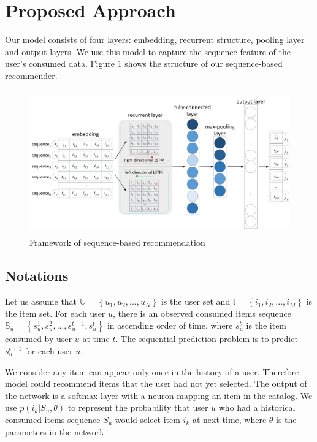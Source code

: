 \documentclass[runningheads]{llncs}
\begin{document}
\section{Proposed Approach}

Our model consists of four layers: embedding, recurrent structure, pooling layer and output layers. We use this model to capture the sequence feature of the user's consumed data. Figure 1 shows the structure of our sequence-based recommender.
\begin{figure}[htbp]
\centerline
{\includegraphics[height=6.2cm,width=\linewidth]{image/structer.png}}
\caption{Framework of sequence-based recommendation }
\end{figure}
\subsection{Notations }\label{AA}
Let us assume that $\mathbb{U}= \left \{ u_{1},u_{2},...,u_{N} \right \}\label{eq}$ is the user set and $\mathbb{I}= \left \{ i_{1},i_{2},...,i_{M} \right \}$ is the item set. For each user $u$, there is an observed consumed items sequence $\mathbb{S}_{u}=\left \{ s_{u}^{1},s_{u}^{2},...,s_{u}^{t-1},s_{u}^{t} \right \}$ in ascending order of time, where $s_{u}^{t}$ is the item consumed by user $u$ at time $t$. The sequential prediction problem is to predict $s_{u}^{t+1}$ for each user $u$.

We consider any item can appear only once in the history of a user. Therefore model could recommend items that the user had not yet selected. The output of the network is a softmax layer with a neuron mapping an item in the catalog. We use $p(i_{k}|S_{u},\theta )$ to represent the probability that user $u$ who had a historical consumed items sequence $S_{u}$ would select item $i_{k}$ at next time, where $\theta$ is the parameters in the network.
\end{document}
